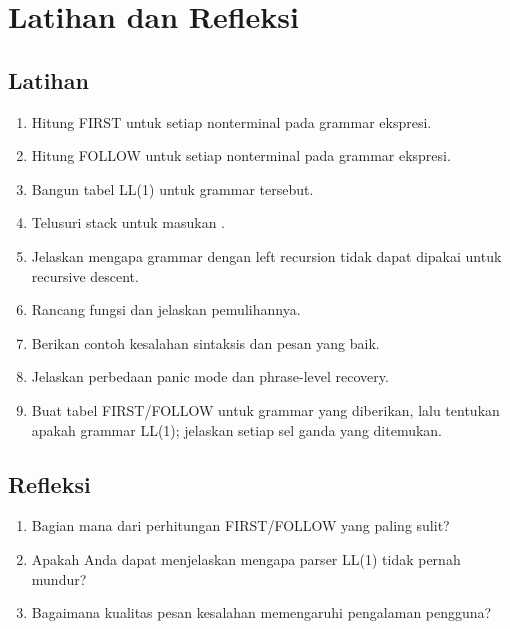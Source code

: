 \section*{Latihan dan Refleksi}

\subsection*{Latihan}
\begin{enumerate}[label=\arabic*.,leftmargin=*]
  \item Hitung FIRST untuk setiap nonterminal pada grammar ekspresi.
  \item Hitung FOLLOW untuk setiap nonterminal pada grammar ekspresi.
  \item Bangun tabel LL(1) untuk grammar tersebut.
  \item Telusuri stack untuk masukan .
  \item Jelaskan mengapa grammar dengan left recursion tidak dapat
        dipakai untuk recursive descent.
  \item Rancang fungsi  dan jelaskan pemulihannya.
  \item Berikan contoh kesalahan sintaksis dan pesan yang baik.
  \item Jelaskan perbedaan panic mode dan phrase-level recovery.
  \item Buat tabel FIRST/FOLLOW untuk grammar yang diberikan, lalu
        tentukan apakah grammar LL(1); jelaskan setiap sel ganda yang
        ditemukan.
\end{enumerate}

\subsection*{Refleksi}
\begin{reflectionbox}
\begin{enumerate}[label=\arabic*.,leftmargin=*]
  \item Bagian mana dari perhitungan FIRST/FOLLOW yang paling sulit?
  \item Apakah Anda dapat menjelaskan mengapa parser LL(1) tidak
        pernah mundur?
  \item Bagaimana kualitas pesan kesalahan memengaruhi pengalaman
        pengguna?
\end{enumerate}
\end{reflectionbox}
